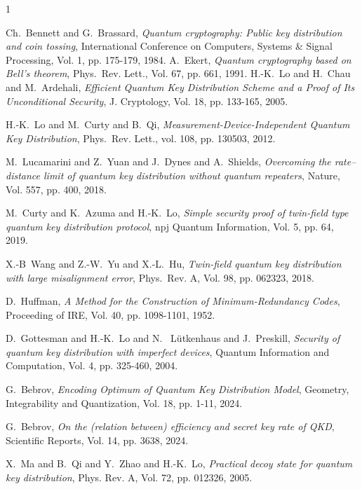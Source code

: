 \documentclass[journal,onecolumn]{IEEEtran}
\theoremstyle{thmstyleone}%
\theoremstyle{thmstyletwo}%
\theoremstyle{thmstylethree}%
\begin{document}
	
	\begin{thebibliography}{1}
		
			Ch.~Bennett and  G.~Brassard, \emph{Quantum cryptography: Public key distribution and coin tossing}, International Conference on Computers, Systems \& Signal Processing, Vol. 1,
			pp. 175-179, 1984.
			A.~Ekert, \emph{Quantum cryptography based on Bell’s theorem}, Phys.\ Rev. Lett., Vol. 67, pp. 661, 1991.
			H.-K.~Lo and H.~Chau and M.~Ardehali, \emph{Efficient Quantum Key Distribution Scheme and a Proof of Its Unconditional Security}, J. Cryptology, Vol. 18, pp. 133-165, 2005.
		
			H.-K.~Lo and M.~Curty and B.~Qi,
			\emph{Measurement-Device-Independent Quantum Key Distribution}, Phys.\ Rev. Lett., vol. 108, pp. 130503, 2012.
		
			M.~Lucamarini and  Z.~Yuan and  J.~Dynes and  A.~Shields, \emph{Overcoming the rate–distance limit of quantum key distribution without quantum repeaters},
			Nature, Vol. 557, pp. 400, 2018.
		
		
		M.~Curty and K.~Azuma  and  H.-K.~Lo, 
		\emph{Simple  security  proof  of  twin-ﬁeld  type  quantum  key distribution  protocol}, npj Quantum Information, Vol. 5, pp. 64, 2019.
		
			X.-B~Wang and  Z.-W.~Yu and X.-L.~Hu, 
			\emph{Twin-ﬁeld quantum key distribution with large misalignment error}, Phys.\ Rev. A, Vol. 98, pp. 062323, 2018.
		
		D.~Huffman, \emph{A Method for the Construction of Minimum-Redundancy Codes}, Proceeding of IRE, Vol. 40, pp. 1098-1101, 1952.
		
		D.~Gottesman and H.-K.~Lo and N.~ L{\"u}tkenhaus and J.~Preskill, 
		\emph{Security of quantum key distribution with imperfect devices}, Quantum Information and Computation, Vol. 4, pp. 325-460, 2004.
		
		G.~Bebrov, \emph{Encoding Optimum of Quantum Key Distribution Model}, Geometry, Integrability and Quantization, Vol. 18, pp. 1-11, 2024.
		
		G.~Bebrov, \emph{On the (relation between) efficiency and secret key rate of QKD}, Scientific Reports, Vol. 14, pp. 3638, 2024.
		
		X.~Ma and B.~Qi and Y.~Zhao and H.-K.~Lo, \emph{Practical decoy state for quantum key distribution}, Phys. Rev. A, Vol. 72, pp. 012326, 2005.
		

\end{thebibliography}
\end{document}
